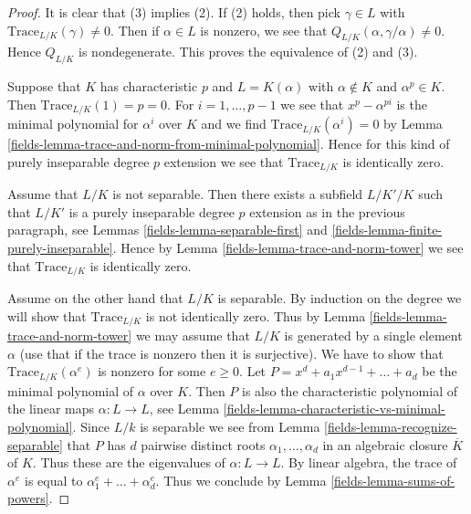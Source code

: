 \begin{proof}

It is clear that (3) implies (2). If (2) holds, then pick $\gamma \in L$
with $\text{Trace}_{L/K}(\gamma) \not = 0$. Then if $\alpha \in L$
is nonzero, we see that $Q_{L/K}(\alpha, \gamma/\alpha) \not = 0$.
Hence $Q_{L/K}$ is nondegenerate. This proves the equivalence of
(2) and (3).

\medskip\noindent
Suppose that $K$ has characteristic $p$ and $L = K(\alpha)$ with
$\alpha \not \in K$ and $\alpha^p \in K$. Then $\text{Trace}_{L/K}(1) = p = 0$.
For $i = 1, \ldots, p - 1$ we see that $x^p - \alpha^{pi}$ is the minimal
polynomial for $\alpha^i$ over $K$ and we find
$\text{Trace}_{L/K}(\alpha^i) = 0$ by
Lemma \ref{fields-lemma-trace-and-norm-from-minimal-polynomial}.
Hence for this kind of purely inseparable degree $p$ extension
we see that $\text{Trace}_{L/K}$ is identically zero.

\medskip\noindent
Assume that $L/K$ is not separable. Then there exists a subfield
$L/K'/K$ such that $L/K'$ is a purely inseparable degree $p$ extension
as in the previous paragraph, see
Lemmas \ref{fields-lemma-separable-first} and \ref{fields-lemma-finite-purely-inseparable}.
Hence by Lemma \ref{fields-lemma-trace-and-norm-tower}
we see that $\text{Trace}_{L/K}$ is identically zero.

\medskip\noindent
Assume on the other hand that $L/K$ is separable.
By induction on the degree we will show that
$\text{Trace}_{L/K}$ is not identically zero.
Thus by Lemma \ref{fields-lemma-trace-and-norm-tower} we may assume that
$L/K$ is generated by a single element $\alpha$ (use that if
the trace is nonzero then it is surjective).
We have to show that $\text{Trace}_{L/K}(\alpha^e)$
is nonzero for some $e \geq 0$.
Let $P = x^d + a_1 x^{d - 1} + \ldots + a_d$ be the minimal
polynomial of $\alpha$ over $K$.
Then $P$ is also the characteristic polynomial of the linear
maps $\alpha : L \to L$, see
Lemma \ref{fields-lemma-characteristic-vs-minimal-polynomial}.
Since $L/k$ is separable we see from Lemma \ref{fields-lemma-recognize-separable}
that $P$ has $d$ pairwise distinct roots $\alpha_1, \ldots, \alpha_d$
in an algebraic closure $\overline{K}$ of $K$. Thus these are the
eigenvalues of $\alpha : L \to L$.
By linear algebra, the trace of $\alpha^e$ is
equal to $\alpha_1^e + \ldots + \alpha_d^e$.
Thus we conclude by Lemma \ref{fields-lemma-sums-of-powers}.
\end{proof}

